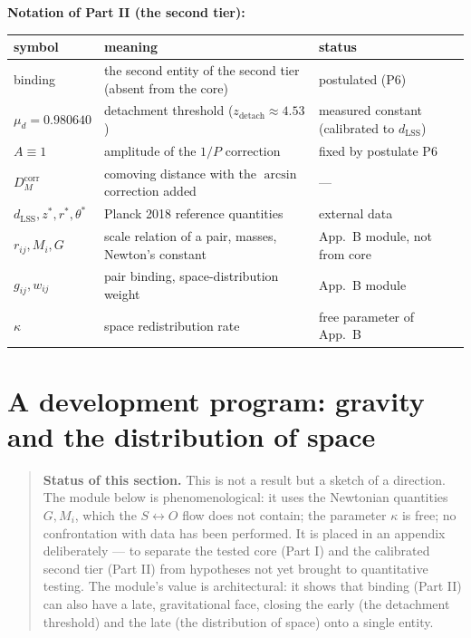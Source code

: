 \documentclass{article}
\begin{document}
\noindent\textbf{Notation of Part II (the second tier):}

\begin{table}[htbp]
\centering
\small
\begin{tabular}{@{}lll@{}}
\toprule
\textbf{symbol} & \textbf{meaning} & \textbf{status} \\
\midrule
binding & the second entity of the second tier (absent from the core) & postulated (P6) \\
$\mu_d = 0.980640$ & detachment threshold ($z_{\text{detach}} \approx 4.53$) & measured constant (calibrated to $d_{\text{LSS}}$) \\
$A \equiv 1$ & amplitude of the $1/P$ correction & fixed by postulate P6 \\
$D_M^{\text{corr}}$ & comoving distance with the $\arcsin$ correction added & --- \\
$d_{\text{LSS}}, z^*, r^*, \theta^*$ & Planck 2018 reference quantities & external data \\
$r_{ij}, M_i, G$ & scale relation of a pair, masses, Newton's constant & App.\ B module, not from core \\
$g_{ij}, w_{ij}$ & pair binding, space-distribution weight & App.\ B module \\
$\kappa$ & space redistribution rate & free parameter of App.\ B \\
\bottomrule
\end{tabular}
\end{table}

\section{A development program: gravity and the distribution of space}

\begin{quote}
\textbf{Status of this section.} This is not a result but a sketch of a direction. The module below is phenomenological: it uses the Newtonian quantities $G, M_i$, which the $S \leftrightarrow O$ flow does not contain; the parameter $\kappa$ is free; no confrontation with data has been performed. It is placed in an appendix deliberately --- to separate the tested core (Part I) and the calibrated second tier (Part II) from hypotheses not yet brought to quantitative testing. The module's value is architectural: it shows that binding (Part II) can also have a late, gravitational face, closing the early (the detachment threshold) and the late (the distribution of space) onto a single entity.
\end{quote}
\end{document}
